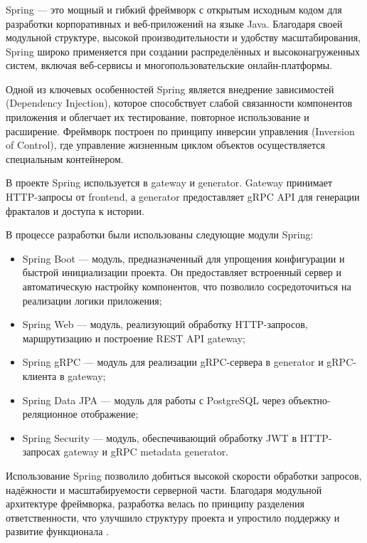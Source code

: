 \subsubsection{}

Spring --- это мощный и гибкий фреймворк с открытым исходным кодом для разработки корпоративных и веб-приложений на языке Java. Благодаря своей модульной структуре, высокой производительности и удобству масштабирования, Spring широко применяется при создании распределённых и высоконагруженных систем, включая веб-сервисы и многопользовательские онлайн-платформы.

Одной из ключевых особенностей Spring является внедрение зависимостей (Dependency Injection), которое способствует слабой связанности компонентов приложения и облегчает их тестирование, повторное использование и расширение. Фреймворк построен по принципу инверсии управления (Inversion of Control), где управление жизненным циклом объектов осуществляется специальным контейнером.

В проекте Spring используется в gateway и generator. Gateway принимает HTTP-запросы от frontend, а generator предоставляет gRPC API для генерации фракталов и доступа к истории.

В процессе разработки были использованы следующие модули Spring:
\begin{itemize}
  \item Spring Boot --- модуль, предназначенный для упрощения конфигурации и быстрой инициализации проекта. Он предоставляет встроенный сервер и автоматическую настройку компонентов, что позволило сосредоточиться на реализации логики приложения;

  \item Spring Web --- модуль, реализующий обработку HTTP-запросов, маршрутизацию и построение REST API gateway;

  \item Spring gRPC --- модуль для реализации gRPC-сервера в generator и gRPC-клиента в gateway;

  \item Spring Data JPA --- модуль для работы с PostgreSQL через объектно-реляционное отображение;

  \item Spring Security --- модуль, обеспечивающий обработку JWT в HTTP-запросах gateway и gRPC metadata generator.
\end{itemize}

Использование Spring позволило добиться высокой скорости обработки запросов, надёжности и масштабируемости серверной части. Благодаря модульной архитектуре фреймворка, разработка велась по принципу разделения ответственности, что улучшило структуру проекта и упростило поддержку и развитие функционала \cite{spring}.


